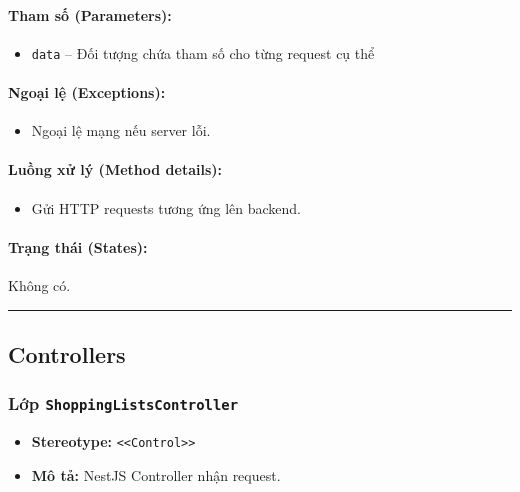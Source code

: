 \documentclass[12pt,a4paper]{article}
\begin{document}
\paragraph{Tham số (Parameters):}
\begin{itemize}[leftmargin=*]
    \item \texttt{data} – Đối tượng chứa tham số cho từng request cụ thể
\end{itemize}


\paragraph{Ngoại lệ (Exceptions):}
\begin{itemize}[leftmargin=*]
    \item Ngoại lệ mạng nếu server lỗi.
\end{itemize}


\paragraph{Luồng xử lý (Method details):}
\begin{itemize}[leftmargin=*]
    \item Gửi HTTP requests tương ứng lên backend.
\end{itemize}


\paragraph{Trạng thái (States):}
Không có.

\vskip 0.5cm
\noindent\rule{\textwidth}{0.5pt}
\vskip 0.5cm

\subsection{Controllers}


\subsubsection{Lớp \texttt{ShoppingListsController}}

\begin{itemize}[leftmargin=*]
    \item \textbf{Stereotype:} \texttt{\textless{}\textless{}Control\textgreater{}\textgreater{}}
    \item \textbf{Mô tả:} NestJS Controller nhận request.
\end{itemize}
\end{document}
